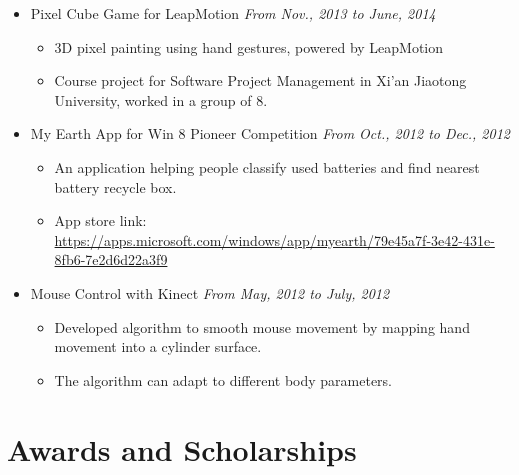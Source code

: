 \documentclass[a4paper,11pt]{article}
\begin{document}
\begin{itemize}
    \item Pixel Cube Game for LeapMotion \hfill \textit{From Nov., 2013 to June, 2014}
    \begin{itemize}
        \item 3D pixel painting using hand gestures, powered by LeapMotion
        \item Course project for Software Project Management in Xi'an Jiaotong University, worked in a group
of 8.
    \end{itemize}

    \item My Earth App for Win 8 Pioneer Competition \hfill \textit{From Oct., 2012 to Dec., 2012}
    \begin{itemize}
        \item An application helping people classify used batteries and find nearest battery recycle box.
        \item App store link:
        \url{https://apps.microsoft.com/windows/app/myearth/79e45a7f-3e42-431e-8fb6-7e2d6d22a3f9}
    \end{itemize}

    \item Mouse Control with Kinect \hfill \textit{From May, 2012 to July, 2012}
    \begin{itemize}
        \item Developed algorithm to smooth mouse movement by mapping hand movement into a cylinder surface.
        \item The algorithm can adapt to different body parameters.
    \end{itemize}
\end{itemize}


\section{Awards and Scholarships}
\end{document}
